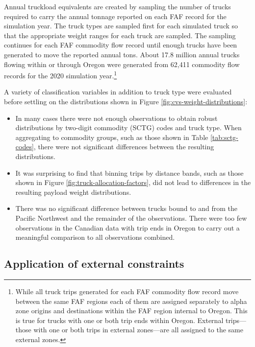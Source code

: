 Annual truckload equivalents are created by sampling the number of trucks required to carry the annual tonnage reported on each FAF record for the simulation year. The truck types are sampled first for each simulated truck so that the appropriate weight ranges for each truck are sampled. The sampling continues for each FAF commodity flow record until enough trucks have been generated to move the reported annual tons. About 17.8 million annual trucks flowing within or through Oregon were generated from 62,411 commodity flow records for the 2020 simulation year.\footnote{While all truck trips generated for each FAF commodity flow record move between the same FAF regions each of them are assigned separately to alpha zone origins and destinations within the FAF region internal to Oregon. This is true for trucks with one or both trip ends within Oregon. External trips---those with one or both trips in external zones---are all assigned to the same external zones.}

A variety of classification variables in addition to truck type were evaluated before settling on the distributions shown in Figure \ref{fig:cvs-weight-distributions}:
\begin{itemize}
\item In many cases there were not enough observations to obtain robust distributions by two-digit commodity (SCTG) codes and truck type. When aggregating to commodity groups, such as those shown in Table \ref{tab:sctg-codes}, there were not significant differences between the resulting distributions. 
\item It was surprising to find that binning trips by distance bands, such as those shown in Figure \ref{fig:truck-allocation-factors}, did not lead to differences in the resulting payload weight distributions.
\item There was no significant difference between trucks bound to and from the Pacific Northwest and the remainder of the observations. There were too few observations in the Canadian data with trip ends in Oregon to carry out a meaningful comparison to all observations combined.
\end{itemize}

\subsection{Application of external constraints}

